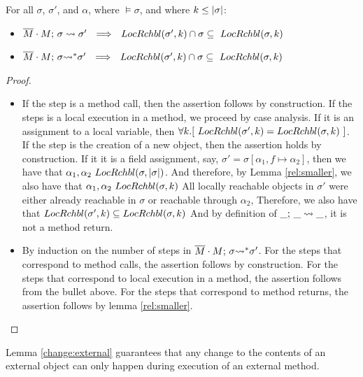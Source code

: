 {{
\begin{lemma} For all $\sigma$, $\sigma'$, and $\alpha$, where $\models \sigma$, and where $k\leq |\sigma|$:
\label{exec:rel}
\begin{itemize}
\item
$\leadstoBounded  {\Mtwo\cdot M}  {\sigma}  {\sigma'}\ \  \Longrightarrow\ \ 
  \LRelevantKO   {\sigma'} {k}\cap \sigma   \subseteq\   \LRelevantKO {\sigma} {k}  $
\item
$\leadstoBoundedStar  {\Mtwo\cdot M}  {\sigma}  {\sigma'}\ \  \Longrightarrow\ \ 
  \LRelevantKO   {\sigma'} {k}\cap \sigma   \subseteq\   \LRelevantKO {\sigma} {k} $
\end{itemize}
\end{lemma}
 }
 
\begin{proof} $~ $

\begin{itemize}
\item
If the step is a method call, then the assertion follows by construction.
If the steps is a   local execution in a method, we proceed by case analysis. If it is an assignment to a local variable, then 
$\forall k.[\ LocRchbl(\sigma',k)= LocRchbl(\sigma,k)\ ]$.
If the step is the creation of a new object, then the assertion holds by construction.
If it it is a field assignment, say, $\sigma'=\sigma[\alpha_1,f \mapsto \alpha_2]$, then we have that 
$\alpha_1, \alpha_2 \  LocRchbl(\sigma,|\sigma|)$. 
And therefore, by Lemma \ref{rel:smaller}, we also have that $\alpha_1, \alpha_2 \  LocRchbl(\sigma,k)$
All locally reachable objects in $\sigma'$ were either already reachable in $\sigma$ or reachable through $\alpha_2$,
Therefore, we also have that  $LocRchbl(\sigma',k)\subseteq  LocRchbl(\sigma,k)$
 And by definition of $\_;\, {\_} \rightsquigarrow \_$, it is not a method return.
 
\item
By induction on the number of steps in $\overline{M}\cdot M;\, {\sigma} {\rightsquigarrow^*} \sigma'$. 
For the steps that correspond to method calls, the assertion follows by construction.
For the steps that correspond to local execution in a method, the assertion follows from the bullet above.
For the steps that correspond to method returns, the assertion follows by lemma \ref{rel:smaller}.
\end{itemize}
\end{proof}

Lemma \ref{change:external} guarantees that any change to the contents of an external object can only happen during execution of an external method.
 
}
